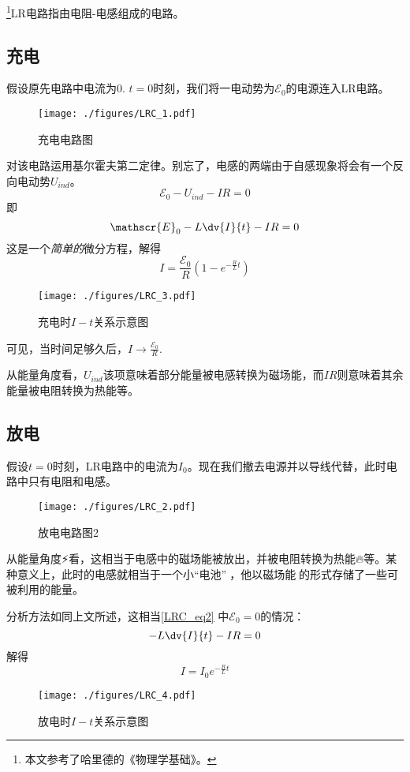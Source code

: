 

\footnote{本文参考了哈里德的《物理学基础》。}LR电路指由电阻-电感组成的电路。

\subsection{充电}
假设原先电路中电流为$0$. $t=0$时刻，我们将一电动势为$\mathscr{E}_0$的电源连入LR电路。
\begin{figure}[ht]
\centering
\texttt{[image: ./figures/LRC\_1.pdf]}
\caption{充电电路图} \label{LRC_fig1}
\end{figure}

对该电路运用基尔霍夫第二定律。别忘了，电感的两端由于自感现象将会有一个反向电动势$U_{ind}$。
$$
\mathscr{E}_0 - U_{ind} - IR = 0
$$
即
\begin{equation}\label{LRC_eq2}
\mathscr{E}_0 - L\dv{I}{t} - IR = 0
\end{equation}
这是一个\textsl{简单的}微分方程，解得
\begin{equation}\label{LRC_eq1}
I = \frac{\mathscr{E}_0}{R} (1-e^{-\frac{R}{L}t})
\end{equation}

\begin{figure}[ht]
\centering
\texttt{[image: ./figures/LRC\_3.pdf]}
\caption{充电时$I-t$关系示意图} \label{LRC_fig3}
\end{figure}
可见，当时间足够久后，$I\to\frac{\mathscr{E_0}}{R}$.

从能量角度看，$U_{ind}$该项意味着部分能量被电感转换为磁场能，而$IR$则意味着其余能量被电阻转换为热能等。

\subsection{放电}
假设$t=0$时刻，LR电路中的电流为$I_0$。现在我们撤去电源并以导线代替，此时电路中只有电阻和电感。
\begin{figure}[ht]
\centering
\texttt{[image: ./figures/LRC\_2.pdf]}
\caption{放电电路图2} \label{LRC_fig2}
\end{figure}
从能量角度⚡️看，这相当于电感中的磁场能被放出，并被电阻转换为热能🔥等。某种意义上，此时的电感就相当于一个小“电池”🔋，他以磁场能🧲的形式存储了一些可被利用的能量。

分析方法如同上文所述，这相当\autoref{LRC_eq2}  中$\mathscr{E}_0=0$的情况：
\begin{equation}
- L\dv{I}{t} - IR = 0
\end{equation}
解得
\begin{equation}
I = I_0 e^{-\frac{R}{L}t}
\end{equation}
\begin{figure}[ht]
\centering
\texttt{[image: ./figures/LRC\_4.pdf]}
\caption{放电时$I-t$关系示意图} \label{LRC_fig4}
\end{figure}
